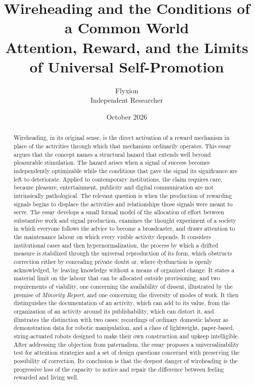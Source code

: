 \documentclass[11pt]{article}
\title{\textbf{Wireheading and the Conditions of a Common World}\\[0.6em]
\large Attention, Reward, and the Limits of Universal Self-Promotion}
\author{Flyxion\\ \small Independent Researcher}
\date{October 2026}
\theoremstyle{definition}
\theoremstyle{remark}
\begin{document}
\maketitle

\begin{abstract}
\noindent
Wireheading, in its original sense, is the direct activation of a reward mechanism in place of the activities through which that mechanism ordinarily operates. This essay argues that the concept names a structural hazard that extends well beyond pleasurable stimulation. The hazard arises when a signal of success becomes independently optimizable while the conditions that gave the signal its significance are left to deteriorate. Applied to contemporary institutions, the claim requires care, because pleasure, entertainment, publicity and digital communication are not intrinsically pathological. The relevant question is when the production of rewarding signals begins to displace the activities and relationships those signals were meant to serve. The essay develops a small formal model of the allocation of effort between substantive work and signal production, examines the thought experiment of a society in which everyone follows the advice to become a broadcaster, and draws attention to the maintenance labour on which every visible activity depends. It considers institutional cases and then hypernormalization, the process by which a drifted measure is stabilized through the universal reproduction of its form, which obstructs correction either by concealing private doubt or, where dysfunction is openly acknowledged, by leaving knowledge without a means of organized change. It states a material limit on the labour that can be allocated outside provisioning, and two requirements of viability, one concerning the availability of dissent, illustrated by the premise of \emph{Minority Report}, and one concerning the diversity of modes of work. It then distinguishes the documentation of an activity, which can add to its value, from the organization of an activity around its publishability, which can distort it, and illustrates the distinction with two cases: recordings of ordinary domestic labour as demonstration data for robotic manipulation, and a class of lightweight, paper-based, string-actuated robots designed to make their own construction and upkeep intelligible. After addressing the objection from paternalism, the essay proposes a universalizability test for attention strategies and a set of design questions concerned with preserving the possibility of correction. Its conclusion is that the deepest danger of wireheading is the progressive loss of the capacity to notice and repair the difference between feeling rewarded and living well.
\end{abstract}
\end{document}
